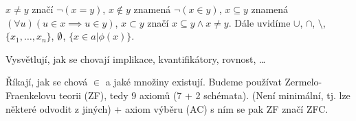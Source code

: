 \documentclass[12pt]{article}                   %
\begin{document}
    \begin{definice}
        $x ≠ y$ značí $\neg(x=y)$, $x \notin y$ znamená $\neg(x \in y)$, $x \subseteq y$ znamená $(\forall u)(u \in x \implies u \in y)$, $x \subset y$ značí $x \subseteq y \land x ≠ y$. Dále uvidíme $\cup$, $\cap$, $\setminus$, $\{x_1, …, x_n\}$, $\emptyset$, $\{x \in a|\phi(x)\}$.
    \end{definice}

    \begin{definice}
        Vysvětlují, jak se chovají implikace, kvantifikátory, rovnost, …
    \end{definice}

    \begin{definice}
        Říkají, jak se chová $\in$ a jaké množiny existují. Budeme používat Zermelo-Fraenkelovu teorii (ZF), tedy 9 axiomů (7 + 2 schémata). (Není minimální, tj. lze některé odvodit z jiných) + axiom výběru (AC) s ním se pak ZF značí ZFC.
    \end{definice}
\end{document}
